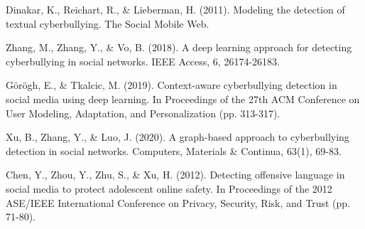 \documentclass[conference]{IEEEtran}
\begin{document}
\begin{thebibliography}{9}
Dinakar, K., Reichart, R., \& Lieberman, H. (2011). Modeling the detection of textual cyberbullying. The Social Mobile Web.\

Zhang, M., Zhang, Y., \& Vo, B. (2018). A deep learning approach for detecting cyberbullying in social networks. IEEE Access, 6, 26174-26183.\

Görögh, E., \& Tkalcic, M. (2019). Context-aware cyberbullying detection in social media using deep learning. In Proceedings of the 27th ACM Conference on User Modeling, Adaptation, and Personalization (pp. 313-317).\

Xu, B., Zhang, Y., \& Luo, J. (2020). A graph-based approach to cyberbullying detection in social networks. Computers, Materials \& Continua, 63(1), 69-83.\

Chen, Y., Zhou, Y., Zhu, S., \& Xu, H. (2012). Detecting offensive language in social media to protect adolescent online safety. In Proceedings of the 2012 ASE/IEEE International Conference on Privacy, Security, Risk, and Trust (pp. 71-80).\
\end{thebibliography}
\end{document}
